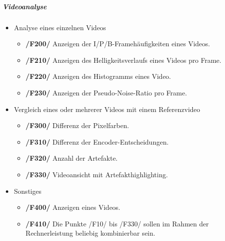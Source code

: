 \subparagraph{Videoanalyse}
\begin{itemize}
	\item Analyse eines einzelnen Videos  
		\begin{itemize}
			\item \textbf{/F200/} Anzeigen der I/P/B-Framehäufigkeiten eines Videos.
			\item \textbf{/F210/} Anzeigen des Helligkeitsverlaufs eines Videos pro Frame.
			\item \textbf{/F220/} Anzeigen des Histogramms eines Video.
			\item \textbf{/F230/} Anzeigen der Pseudo-Noise-Ratio pro Frame.
		   \end{itemize} 
	\item Vergleich eines oder mehrerer Videos mit einem Referenzvideo
		\begin{itemize}
			\item \textbf{/F300/} Differenz der Pixelfarben.
			\item \textbf{/F310/} Differenz der Encoder-Entscheidungen.
			\item \textbf{/F320/} Anzahl der Artefakte.
			\item \textbf{/F330/} Videoansicht mit Artefakthighlighting.
		\end{itemize}	
	\item Sonstiges
		\begin{itemize}
			\item \textbf{/F400/} Anzeigen eines Videos. 
			\item \textbf{/F410/} Die Punkte /F10/ bis /F330/ sollen im Rahmen der Rechnerleistung beliebig kombinierbar sein.
		\end{itemize}
\end{itemize}

